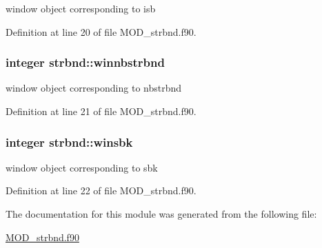 window object corresponding to isb 



Definition at line 20 of file M\-O\-D\-\_\-strbnd.\-f90.

\hypertarget{classstrbnd_a55f2ae82aee68ac7afa009bda39faf42}{
\subsubsection[{winnbstrbnd}]{\setlength{\rightskip}{0pt plus 5cm}integer strbnd\-::winnbstrbnd}}\label{classstrbnd_a55f2ae82aee68ac7afa009bda39faf42}


window object corresponding to nbstrbnd 



Definition at line 21 of file M\-O\-D\-\_\-strbnd.\-f90.

\hypertarget{classstrbnd_a474b1bf0604b704ca1a33b2c926b4daa}{
\subsubsection[{winsbk}]{\setlength{\rightskip}{0pt plus 5cm}integer strbnd\-::winsbk}}\label{classstrbnd_a474b1bf0604b704ca1a33b2c926b4daa}


window object corresponding to sbk 



Definition at line 22 of file M\-O\-D\-\_\-strbnd.\-f90.



The documentation for this module was generated from the following file\-:\begin{DoxyCompactItemize}
\item 
\hyperlink{MOD__strbnd_8f90}{M\-O\-D\-\_\-strbnd.\-f90}\end{DoxyCompactItemize}
